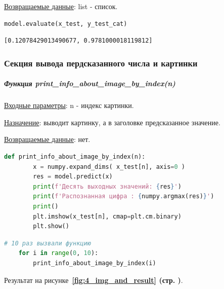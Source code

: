 \underline{Возвращаемые данные}: list - список.

\begin{lstlisting}[language=Python,]
    model.evaluate(x_test, y_test_cat)
\end{lstlisting}

\begin{lstlisting}[name=Вывод в консоль,]
    [0.12078429013490677, 0.9781000018119812]
\end{lstlisting}



\subsubsection{Секция вывода пердсказанного числа и картинки}

\subparagraph{Функция print\_info\_about\_image\_by\_index(n)} \hspace{0pt}

\underline{Входные параметры}: n - индекс картинки.

\underline{Назначение}: выводит картинку, а в заголовке предсказанное значение.

\underline{Возвращаемые данные}: нет.

\begin{lstlisting}[language=Python,]
    def print_info_about_image_by_index(n):
        x = numpy.expand_dims( x_test[n], axis=0 )
        res = model.predict(x)
        print(f'Десять выходных значений: {res}')
        print(f'Распознанная цифра : {numpy.argmax(res)}')
        print()
        plt.imshow(x_test[n], cmap=plt.cm.binary)
        plt.show()
\end{lstlisting}

\begin{lstlisting}[language=Python,]
    # 10 раз вызвали функцию
    for i in range(0, 10):
        print_info_about_image_by_index(i)
\end{lstlisting}

Результат на
рисунке~\textbf{\ref{fig:4_img_and_result} (стр. \pageref{fig:4_img_and_result})}.

